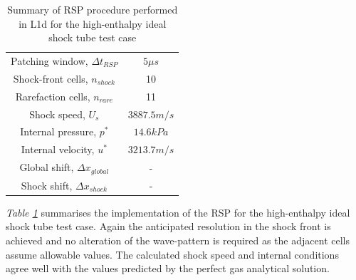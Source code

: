 \documentclass[a4paper,10pt]{article}
\begin{document}
\begin{table}[hb]
\begin{center}  %
\begin{tabular*}{0.5\textwidth}%
     {@{\extracolsep{\fill}}cc}
\hline Patching window, $\Delta t_{RSP}$ & $5 \mu s$ \\
Shock-front cells, $n_{shock}$ & 10 \\
Rarefaction cells, $n_{rare}$ & 11 \\
Shock speed, $U_{s}$ & $3887.5 m/s$ \\
Internal pressure, $p^{*}$ & $14.6 kPa$ \\
Internal velocity, $u^{*}$ & $3213.7 m/s$ \\
Global shift, $\Delta x_{global}$ & - \\
Shock shift, $\Delta x_{shock}$ & - \\
\hline
\end{tabular*}
\caption{Summary of RSP procedure performed in L1d for the high-enthalpy ideal shock tube test case} \label{table:he_rsp}
\end{center}
\end{table}

\emph{Table \ref{table:he_rsp}} summarises the implementation of the RSP for the high-enthalpy ideal shock tube test case.  Again the anticipated resolution in the shock front is achieved and no alteration of the wave-pattern is required as the adjacent cells assume allowable values.  The calculated shock speed and internal conditions agree well with the values predicted by the perfect gas analytical solution.

\par \medskip
\end{document}
